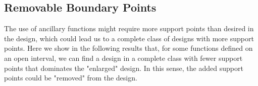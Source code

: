 \documentclass[11pt]{amsart}
\newtheorem{lemma}[theorem]{Lemma}
\theoremstyle{definition}
\theoremstyle{remark}
\numberwithin{equation}{section}
\begin{document}
 

 







 
 
\subsection{Removable Boundary Points}
The use of ancillary functions might require more support points than desired in the design, which could lead us to a complete class of designs with more support points. Here we show in the following results that, for some functions defined on an open interval, we can find a design in a complete class with fewer support points that dominates the "enlarged" design. In this sense, the added support points could be "removed" from the design. 
\end{document}

